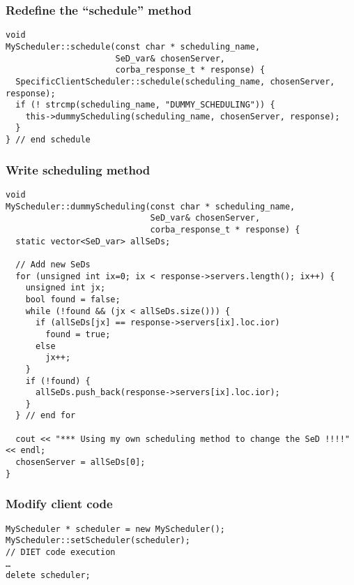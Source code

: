\subsubsection{Redefine the ``schedule'' method}

\begin{verbatim}
void
MyScheduler::schedule(const char * scheduling_name,
                      SeD_var& chosenServer,
                      corba_response_t * response) {
  SpecificClientScheduler::schedule(scheduling_name, chosenServer, response);
  if (! strcmp(scheduling_name, "DUMMY_SCHEDULING")) {
    this->dummyScheduling(scheduling_name, chosenServer, response);
  }
} // end schedule
\end{verbatim}


\subsubsection{Write scheduling method}

\begin{verbatim}
void
MyScheduler::dummyScheduling(const char * scheduling_name,
                             SeD_var& chosenServer,
                             corba_response_t * response) {
  static vector<SeD_var> allSeDs;

  // Add new SeDs
  for (unsigned int ix=0; ix < response->servers.length(); ix++) {
    unsigned int jx;
    bool found = false;
    while (!found && (jx < allSeDs.size())) {
      if (allSeDs[jx] == response->servers[ix].loc.ior) 
        found = true;
      else
        jx++;
    }
    if (!found) {
      allSeDs.push_back(response->servers[ix].loc.ior);
    }
  } // end for

  cout << "*** Using my own scheduling method to change the SeD !!!!" << endl;
  chosenServer = allSeDs[0];
}
\end{verbatim}


\subsubsection{Modify client code}

\begin{verbatim}
MyScheduler * scheduler = new MyScheduler();
MyScheduler::setScheduler(scheduler);
// DIET code execution
…
delete scheduler;
\end{verbatim}